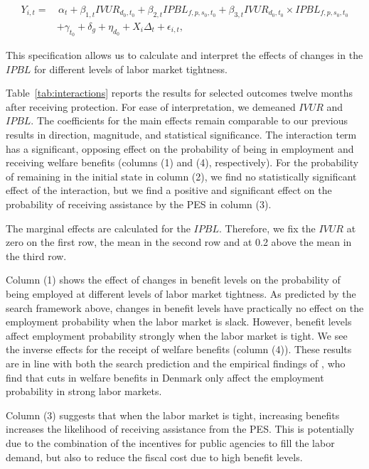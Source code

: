 \begin{equation}\label{eq:main_interaction}
\begin{aligned}
Y_{i,t} = & \, \alpha_t + \beta_{1,t} IVUR_{d_0,t_0} + \beta_{2,t} IPBL_{f,p,s_0,t_0} + \beta_{3,t} IVUR_{d_0,t_0} \times IPBL_{f,p,s_0,t_0} \\
& + \gamma_{t_0} + \delta_{g} + \eta_{d_0} + X_{i}\Delta_t + \epsilon_{i,t},
\end{aligned}
\end{equation}

This specification allows us to calculate and interpret the effects of changes in the $IPBL$ for different levels of labor market tightness.

Table~\ref{tab:interactions} reports the results for selected outcomes twelve months after receiving protection. For ease of interpretation, we demeaned $IVUR$ and $IPBL$. The coefficients for the main effects remain comparable to our previous results in direction, magnitude, and statistical significance. The interaction term has a significant, opposing effect on the probability of being in employment and receiving welfare benefits (columns (1) and (4), respectively). For the probability of remaining in the initial state in column (2), we find no statistically significant effect of the interaction, but we find a positive and significant effect on the probability of receiving assistance by the PES in column (3).

The marginal effects are calculated for the $IPBL$. Therefore, we fix the $IVUR$ at zero on the first row, the mean in the second row and at 0.2 above the mean in the third row.

Column (1) shows the effect of changes in benefit levels on the probability of being employed at different levels of labor market tightness. As predicted by the search framework above, changes in benefit levels have practically no effect on the employment probability when the labor market is slack. However, benefit levels affect employment probability strongly when the labor market is tight. We see the inverse effects for the receipt of welfare benefits (column (4)).
These results are in line with both the search prediction and the empirical findings of \citet{dustmann2024}, who find that cuts in welfare benefits in Denmark only affect the employment probability in strong labor markets.

Column (3) suggests that when the labor market is tight, increasing benefits increases the likelihood of receiving assistance from the PES. This is potentially due to the combination of the incentives for public agencies to fill the labor demand, but also to reduce the fiscal cost due to high benefit levels.

